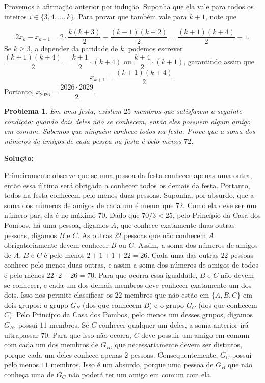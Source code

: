 \documentclass{hipatia}
\newtheorem{problem*}{Problema}
\begin{document}
Provemos a afirmação anterior por indução. Suponha que ela vale para todos os inteiros $i \in \{3,4, \ldots, k\}$. Para provar que também vale para $k+1$, note que 

$$2x_k - x_{k-1} = 2 \cdot \dfrac{k(k+3)}{2} - \dfrac{(k-1)(k+2)}{2} = \dfrac{(k+1)(k+4)}{2} - 1.$$
Se $k \geq 3$, a depender da paridade de $k$, podemos escrever $\dfrac{(k+1)(k+4)}{2} = \dfrac{k+1}{2} \cdot (k+4)$ ou $\dfrac{k+4}{2} \cdot (k+1)$, garantindo assim que 
$$x_{k+1} = \dfrac{(k+1)(k+4)}{2}.$$
Portanto, $x_{2026} = \dfrac{2026 \cdot 2029}{2}.$

\begin{problem*}
Em uma festa, existem $25$ membros que satisfazem a seguinte condição: quando dois deles não se conhecem, então eles possuem algum amigo em comum. Sabemos que ninguém conhece todos na festa. Prove que a soma dos números de amigos de cada pessoa na festa é pelo menos $72$.
\end{problem*}

\noindent \textbf{Solução:}

Primeiramente observe que se uma pessoa da festa conhecer apenas uma outra, então essa última será obrigada a conhecer todos os demais da festa. Portanto, todos na festa conhecem pelo menos duas pessoas. Suponha, por absurdo, que a soma dos números de amigos de cada um é menor que $72$. Como ela deve ser um número par, ela é no máximo $70$. Dado que $70/3 < 25$, pelo Princípio da Casa dos Pombos, há uma pessoa, digamos $A$, que conhece exatamente duas outras pessoas, digamos $B$ e $C$. As outras $22$ pessoas que não conhecem $A$ obrigatoriamente devem conhecer $B$ ou $C$. Assim, a soma dos números de amigos de $A$, $B$ e $C$ é pelo menos $2+1+1+22 = 26$. Cada uma das outras $22$ pessoas conhece pelo menos duas outras, e assim a soma dos números de amigos de todos é pelo menos $22\cdot 2 + 26 = 70$. Para que ocorra essa igualdade, $B$ e $C$ não devem se conhecer, e cada um dos demais membros deve conhecer exatamente um dos dois. Isso nos permite classificar os $22$ membros que não estão em $\{A,B,C\}$ em dois grupos: o grupo $G_B$ (dos que conhecem $B$) e o grupo $G_C$ (dos que conhecem $C$). Pelo Princípio da Casa dos Pombos, pelo menos um desses grupos, digamos $G_B$, possui $11$ membros. Se $C$ conhecer qualquer um deles, a soma anterior irá ultrapassar $70$. Para que isso não ocorra, $C$ deve possuir um amigo em comum com cada um dos membros de $G_B$, que necessariamente devem ser distintos, porque cada um deles conhece apenas $2$ pessoas. Consequentemente, $G_C$ possui pelo menos $11$ membros. Isso é um absurdo, porque uma pessoa de $G_B$ que não conheça uma de $G_C$ não poderá ter um amigo em comum com ela.
\end{document}
